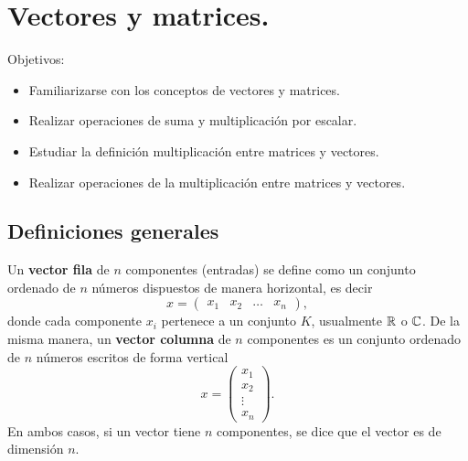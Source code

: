 \section{Vectores y matrices.}
Objetivos:
\begin{itemize}
    \item Familiarizarse con los conceptos de vectores y matrices.
    \item Realizar operaciones de suma y multiplicación por escalar.
    \item Estudiar la definición multiplicación entre matrices y vectores.
    \item Realizar operaciones de la multiplicación entre matrices y
vectores.
\end{itemize}

\subsection{Definiciones generales}
Un \textbf{vector fila} de $n$ componentes (entradas) se define como un conjunto ordenado de $n$ números dispuestos de manera horizontal, es decir 
\[x= \left(\begin{array}{ccccc}
   x_1 & x_2 &  \dots&  x_n 
\end{array}\right),\]
donde cada componente $x_i$ pertenece a un conjunto $K$, usualmente $\mathbb{R}$ o $\mathbb{C}$. 
De la misma manera, un \textbf{vector columna} de $n$ componentes es un conjunto ordenado de $n$ números escritos de forma vertical
\[ x=\left(\begin{array}{c}
   x_1 \\
   x_2 \\
   \vdots\\
   x_n 
\end{array}\right).\]
En ambos casos, si un vector tiene $n$ componentes, se dice que el vector es de dimensión $n$.


